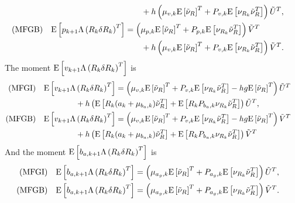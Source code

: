 \begin{theorem}
\begin{subequations}
\begin{flalign}
			&& &\qquad + h\left( \mu_{v,k}\mathrm{E}\left[ \tilde{\nu}_R \right]^T + P_{v,k}\mathrm{E}\left[ \nu_{R_k}\tilde{\nu}_R^T \right] \right) \tilde{U}^T, && \\
			\text{(MFGB)} && \mathrm{E}\left[ p_{k+1}\Lambda\left(R_k\delta R_k\right)^T \right] &= \left( \mu_{p,k}\mathrm{E}\left[ \tilde{\nu}_R \right]^T + P_{p,k}\mathrm{E}\left[ \nu_{R_k}\tilde{\nu}_R^T \right] \right) \tilde{V}^T && \nonumber \\
			&& &\qquad + h\left( \mu_{v,k}\mathrm{E}\left[ \tilde{\nu}_R \right]^T + P_{v,k}\mathrm{E}\left[ \nu_{R_k}\tilde{\nu}_R^T \right] \right) \tilde{V}^T. &&
		\end{flalign}
	\end{subequations}
	The moment $\mathrm{E}\left[ v_{k+1}\Lambda\left(R_k\delta R_k\right)^T \right]$ is
	\begin{subequations} \label{eqn:posEst-prop-EvLambda}
		\allowdisplaybreaks
		\begin{flalign}
			\text{(MFGI)} && &\expect{v_{k+1}\Lambda\left(R_k\delta R_k\right)^T} = \left( \mu_{v,k}\expect{\tilde{\nu}_R}^T + P_{v,k}\expect{\nu_{R_k}\tilde{\nu}_R^T} - hg\expect{\tilde{\nu}_R}^T \right) \tilde{U}^T && \nonumber \\
			&& &\qquad\qquad + h\left( \expect{R_k(a_k+\mu_{b_a,k})\tilde{\nu}_R^T} + \expect{R_kP_{b_a,k}\nu_{R_k}\tilde{\nu}_R^T} \right) \tilde{U}^T, && \\
			\text{(MFGB)} && &\expect{v_{k+1}\Lambda\left(R_k\delta R_k\right)^T} = \left( \mu_{v,k}\expect{\tilde{\nu}_R}^T + P_{v,k}\expect{\nu_{R_k}\tilde{\nu}_R^T} - hg\expect{\tilde{\nu}_R}^T \right) \tilde{V}^T && \nonumber \\
			&& &\qquad\qquad + h\left( \expect{R_k(a_k+\mu_{b_a,k})\tilde{\nu}_R^T} + \expect{R_kP_{b_a,k}\nu_{R_k}\tilde{\nu}_R^T} \right) \tilde{V}^T
		\end{flalign}
	\end{subequations}
	And the moment $\mathrm{E}\left[ b_{a,k+1}\Lambda\left(R_k\delta R_k\right)^T \right]$ is
	\begin{subequations} \label{eqn:posEst-prop-EbaLambda}
		\allowdisplaybreaks
		\begin{flalign}
			\text{(MFGI)} && \expect{b_{a,k+1}\Lambda\left(R_k\delta R_k\right)^T} &= \left( \mu_{a_g,k}\expect{\tilde{\nu}_R}^T + P_{a_g,k}\expect{\nu_{R_k}\tilde{\nu}_R^T} \right) \tilde{U}^T, && \\
			\text{(MFGB)} && \expect{b_{a,k+1}\Lambda\left(R_k\delta R_k\right)^T} &= \left( \mu_{a_g,k}\expect{\tilde{\nu}_R}^T + P_{a_g,k}\expect{\nu_{R_k}\tilde{\nu}_R^T} \right) \tilde{V}^T. &&
		\end{flalign}
	\end{subequations}
	

\end{theorem}
